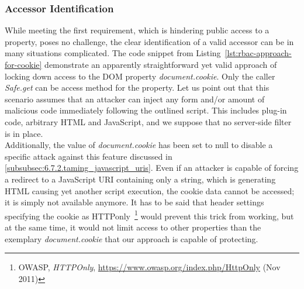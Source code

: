     \subsubsection{Accessor Identification}

    While meeting the first requirement, which is hindering public access to a property, poses no challenge, the clear identification of a valid accessor can be in many situations complicated. The code snippet from Listing~\ref{lst:rbac-approach-for-cookie} demonstrate an apparently straightforward yet valid approach of locking down access to the DOM property \textit{document.cookie}. Only the caller \textit{Safe.get} can be access method for the property. Let us point out that this scenario assumes that an attacker can inject any form and/or amount of malicious code immediately following the outlined script. This includes plug-in code, arbitrary HTML and JavaScript, and we suppose that no server-side filter is in place.\\

    Additionally, the value of \textit{document.cookie} has been set to null to disable a specific attack against this feature discussed in \ref{subsubsec:6.7.2.taming_javascript_uris}. Even if an attacker is capable of forcing a redirect to a JavaScript URI containing only a string, which is generating HTML causing yet another script execution, the cookie data cannot be accessed; it is simply not available anymore. 
    It has to be said that header settings specifying the cookie as HTTPonly~\footnote{OWASP, \textit{HTTPOnly}, \url{https://www.owasp.org/index.php/HttpOnly} (Nov 2011)} would prevent this trick from working, but at the same time, it would not limit access to other properties than the exemplary \textit{document.cookie} that our approach is capable of protecting.\\

